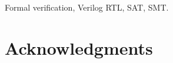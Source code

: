 \documentclass[journal]{IEEEtran}
\theoremstyle{definition}
\begin{document}
\begin{IEEEkeywords}
Formal verification, Verilog RTL, SAT, SMT.
\end{IEEEkeywords}



%






\section*{Acknowledgments}










\end{document}
